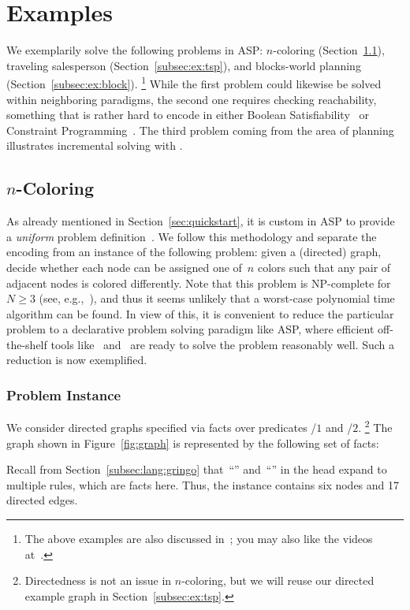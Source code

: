 \section{Examples}\label{sec:examples}

We exemplarily solve the following problems in ASP:
$n$-coloring (Section~\ref{subsec:ex:color}),
traveling salesperson (Section~\ref{subsec:ex:tsp}), and
blocks-world planning (Section~\ref{subsec:ex:block}).%
\footnote{The above examples are also discussed in~\cite{gekakasc12a};
  you may also like the videos at~\cite{potassco}.}
While the first problem could likewise be solved within neighboring paradigms,
the second one requires checking reachability,
something that is rather hard to encode in either
Boolean Satisfiability~\cite{SATHandbook} or
Constraint Programming~\cite{CPHandbook}.
The third problem coming from the area of planning
illustrates incremental solving with \clingo.

\subsection{\texorpdfstring{$n$}{n}-Coloring}\label{subsec:ex:color}

As already mentioned in Section~\ref{sec:quickstart},
it is custom in ASP to provide a \emph{uniform}
problem definition~\cite{martru99a,niemela99a,schlipf95a}.
We follow this methodology and separate the encoding
from an instance of the following problem:
given a (directed) graph, decide whether each node can be assigned
one of~$n$ colors such that any pair of adjacent nodes is colored differently.
Note that this problem is NP-complete for~$N\geq 3$
(see, e.g.,~\cite{papadimitriou94a}),
and thus it seems unlikely that a worst-case polynomial time algorithm
can be found.
In view of this,
it is convenient to reduce the particular problem to
a declarative problem solving paradigm like ASP,
where efficient off-the-shelf tools like \gringo\ and \clasp\
are ready to solve the problem reasonably well.
Such a reduction is now exemplified.

\subsubsection{Problem Instance}\label{subsec:color:instance}


We consider directed graphs specified via facts over predicates
/$1$ and /$2$.%
\footnote{%
  Directedness is not an issue in $n$-coloring,
  but we will reuse our directed example graph in Section~\ref{subsec:ex:tsp}.}
The graph shown in Figure~\ref{fig:graph} is represented by the following set of facts:
%

%
Recall from Section~\ref{subsec:lang:gringo} that~``'' and~``\code{;}''
in the head expand to multiple rules, which are facts here.
Thus, the instance contains six nodes and 17 directed edges.

